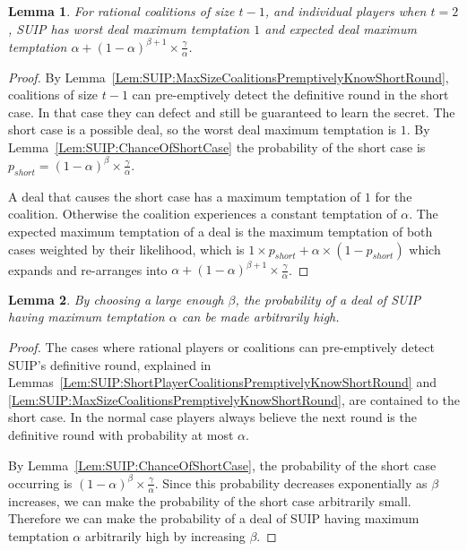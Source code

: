 \documentclass[12pt]{dalcsthesis}
\newtheorem{lemma}{Lemma}
\begin{document}
\begin{lemma}\label{Lem:SUIP:MaxSizeCoalitionsTemptedMore}For rational coalitions of size $t-1$, and individual players when $t=2$, SUIP has worst deal maximum temptation $1$ and expected deal maximum temptation $\alpha + (1-\alpha)^{\beta+1} \times \frac{\gamma}{\alpha}$.\end{lemma}
\begin{proof}
By Lemma~\ref{Lem:SUIP:MaxSizeCoalitionsPremptivelyKnowShortRound}, coalitions of size $t-1$ can pre-emptively detect the definitive round in the short case. In that case they can defect and still be guaranteed to learn the secret. The short case is a possible deal, so the worst deal maximum temptation is $1$. By Lemma~\ref{Lem:SUIP:ChanceOfShortCase} the probability of the short case is $p_{short} = (1-\alpha)^\beta \times \frac{\gamma}{\alpha}$.

A deal that causes the short case has a maximum temptation of $1$ for the coalition. Otherwise the coalition experiences a constant temptation of $\alpha$. The expected maximum temptation of a deal is the maximum temptation of both cases weighted by their likelihood, which is $1 \times p_{short} + \alpha \times (1-p_{short})$ which expands and re-arranges into $\alpha + (1-\alpha)^{\beta+1} \times \frac{\gamma}{\alpha}$.
\end{proof}

\begin{lemma}\label{Lem:SUIP:HighTemptationAvoidable}By choosing a large enough $\beta$, the probability of a deal of SUIP having maximum temptation $\alpha$ can be made arbitrarily high.\end{lemma}
\begin{proof}
The cases where rational players or coalitions can pre-emptively detect SUIP's definitive round, explained in Lemmas~\ref{Lem:SUIP:ShortPlayerCoalitionsPremptivelyKnowShortRound} and \ref{Lem:SUIP:MaxSizeCoalitionsPremptivelyKnowShortRound}, are contained to the short case. In the normal case players always believe the next round is the definitive round with probability at most $\alpha$.

By Lemma~\ref{Lem:SUIP:ChanceOfShortCase}, the probability of the short case occurring is $(1-\alpha)^\beta \times \frac{\gamma}{\alpha}$. Since this probability decreases exponentially as $\beta$ increases, we can make the probability of the short case arbitrarily small. Therefore we can make the probability of a deal of SUIP having maximum temptation $\alpha$ arbitrarily high by increasing $\beta$.
\end{proof}
\end{document}
